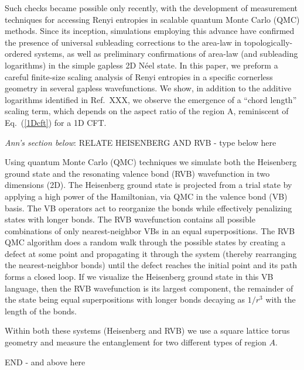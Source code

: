 \documentclass[prl,aps,twocolumn,floatfix,amsmath,amssymb,superscriptaddress,tightenlines]{revtex4}
\begin{document}
Such checks became possible only recently, with the development of measurement techniques for accessing Renyi entropies in scalable quantum Monte Carlo (QMC) methods.  Since its inception, simulations employing this advance have confirmed the presence of universal subleading corrections to the area-law in topologically-ordered systems, as well as preliminary confirmations of area-law (and subleading logarithms) in the simple gapless 2D N\'eel state.  In this paper, we preform a careful finite-size scaling analysis of Renyi entropies in a specific cornerless geometry in several gapless wavefunctions.  We show, in addition to the additive logarithms identified in Ref.~XXX, we observe the emergence of a ``chord length'' scaling term, which depends on the aspect ratio of the region A, reminiscent of Eq.~(\ref{1Dcft}) for a 1D CFT.

{\it \color{red} Ann's section below}:
{\color{red} RELATE HEISENBERG AND RVB - type below here}

Using quantum Monte Carlo (QMC) techniques we simulate both the Heisenberg ground state and the resonating valence bond (RVB) wavefunction in two dimensions (2D). 
The Heisenberg ground state is projected from a trial state by applying a high power of the Hamiltonian, via QMC in the valence bond (VB) basis.\cite{Sandvik_VBQMC}
The VB operators act to reorganize the bonds while effectively penalizing states with longer bonds.
The RVB wavefunction contains all possible combinations of only nearest-neighbor VBs in an equal superpositions.
The RVB QMC algorithm does a random walk through the possible states by creating a defect at some point and propagating it through the system (thereby rearranging the nearest-neighbor bonds) until the defect reaches the initial point and its path forms a closed loop.
If we visualize the Heisenberg ground state in this VB language, then the RVB wavefunction is its largest component, the remainder of the state being equal superpositions with longer bonds decaying as $1/r^3$ \cite{Sandvik_VB_decay} with the length of the bonds.

Within both these systems (Heisenberg and RVB) we use a square lattice torus geometry and measure the entanglement for two different types of region $A$.

{\color{red} END - and above here}
\end{document}
